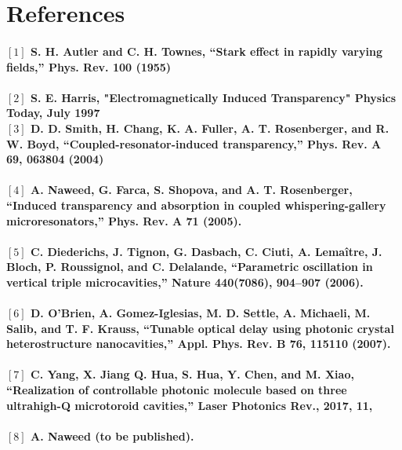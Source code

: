 \newpage
\section*{References}

\paragraph{\normalfont \large $[1]$ S. H. Autler and C. H. Townes, “Stark effect in rapidly varying fields,” Phys. Rev. \textbf{100} (1955) \\ 
\\$[2]$ S. E. Harris, "Electromagnetically Induced Transparency" Physics Today, July 1997
\\$[3]$ D. D. Smith, H. Chang, K. A. Fuller, A. T. Rosenberger, and R. W. Boyd, “Coupled-resonator-induced transparency,” Phys. Rev. A \textbf{69}, 063804 (2004) \\
\\$[4]$  A. Naweed, G. Farca, S. Shopova, and A. T. Rosenberger, “Induced transparency and absorption in coupled
whispering-gallery microresonators,” Phys. Rev. A \textbf{71} (2005).\\
\\$[5]$ C. Diederichs, J. Tignon, G. Dasbach, C. Ciuti, A. Lemaître, J. Bloch, P. Roussignol, and C. Delalande, “Parametric oscillation in vertical triple microcavities,” Nature \textbf{440}(7086), 904–907 (2006).\\
\\$[6]$ D. O’Brien, A. Gomez-Iglesias, M. D. Settle, A. Michaeli, M. Salib, and T. F. Krauss, “Tunable optical delay using photonic crystal heterostructure nanocavities,” Appl. Phys. Rev. B \textbf{76}, 115110 (2007).\\
\\$[7]$ C. Yang,  X. Jiang Q. Hua, S. Hua, Y. Chen, and M. Xiao, “Realization of controllable photonic molecule based on three ultrahigh-Q microtoroid cavities,” Laser Photonics Rev., 2017, \textbf{11},\\
\\$[8]$ A. Naweed (to be published).}